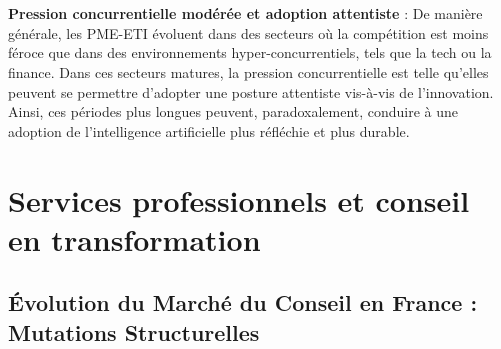 \\\\
\textbf{Pression concurrentielle modérée et adoption attentiste} : De manière générale, les PME-ETI évoluent dans des secteurs où la compétition est moins féroce que dans des environnements hyper-concurrentiels, tels que la tech ou la finance. Dans ces secteurs matures, la pression concurrentielle est telle qu'elles peuvent se permettre d'adopter une posture attentiste vis-à-vis de l'innovation. Ainsi, ces périodes plus longues peuvent, paradoxalement, conduire à une adoption de l'intelligence artificielle plus réfléchie et plus durable.

\section{Services professionnels et conseil en transformation}

\subsection{Évolution du Marché du Conseil en France : Mutations Structurelles}

